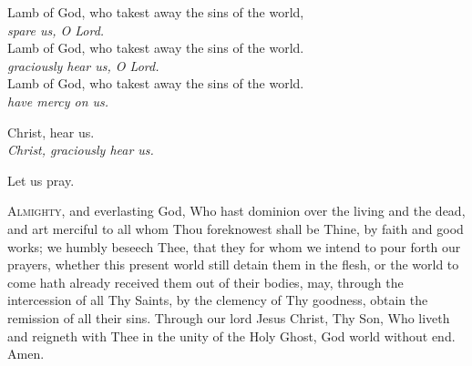 Lamb of God, who takest away the sins of the world,\\
\qquad \textit{spare us, O Lord.}\\
Lamb of God, who takest away the sins of the world.\\
\qquad \textit{graciously hear us, O Lord.}\\
Lamb of God, who takest away the sins of the world.\\
\qquad \textit{have mercy on us.}

Christ, hear us.\\
\textit{Christ, graciously hear us.}

{\centering Let us pray.\par}

\lettrine{A}{lmighty,} and everlasting God, Who hast dominion over the living and
the dead, and art merciful to all whom Thou foreknowest shall be
Thine, by faith and good works; we humbly beseech Thee, that they for
whom we intend to pour forth our prayers, whether this present world
still detain them in the flesh, or the world to come hath already
received them out of their bodies, may, through the intercession of
all Thy Saints, by the clemency of Thy goodness, obtain the remission
of all their sins. Through our lord Jesus Christ, Thy Son, Who liveth
and reigneth with Thee in the unity of the Holy Ghost, God world without end.
\Rbar Amen.

